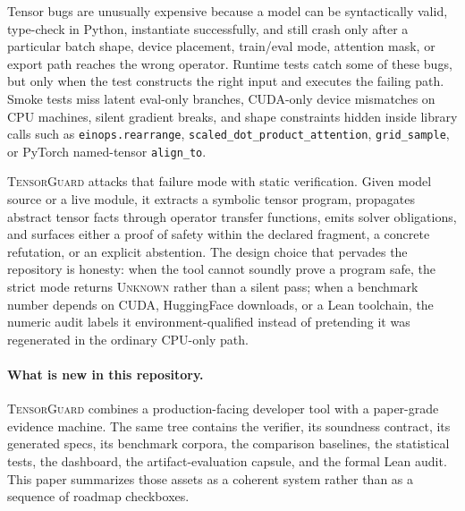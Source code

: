 \documentclass[11pt]{article}
\newcommand{\tg}{\textsc{TensorGuard}}
\newcommand{\unknown}{\textsc{Unknown}}
\begin{document}
Tensor bugs are unusually expensive because a model can be syntactically valid,
type-check in Python, instantiate successfully, and still crash only after a
particular batch shape, device placement, train/eval mode, attention mask, or
export path reaches the wrong operator.  Runtime tests catch some of these
bugs, but only when the test constructs the right input and executes the failing
path.  Smoke tests miss latent eval-only branches, CUDA-only device mismatches
on CPU machines, silent gradient breaks, and shape constraints hidden inside
library calls such as \texttt{einops.rearrange},
\texttt{scaled\_dot\_product\_attention}, \texttt{grid\_sample}, or PyTorch
named-tensor \texttt{align\_to}.

\tg{} attacks that failure mode with static verification.  Given model source
or a live module, it extracts a symbolic tensor program, propagates abstract
tensor facts through operator transfer functions, emits solver obligations, and
surfaces either a proof of safety within the declared fragment, a concrete
refutation, or an explicit abstention.  The design choice that pervades the
repository is honesty: when the tool cannot soundly prove a program safe, the
strict mode returns \unknown{} rather than a silent pass; when a benchmark number
depends on CUDA, HuggingFace downloads, or a Lean toolchain, the numeric audit
labels it environment-qualified instead of pretending it was regenerated in the
ordinary CPU-only path.

\paragraph{What is new in this repository.}
\tg{} combines a production-facing developer tool with a paper-grade evidence
machine.  The same tree contains the verifier, its soundness contract, its
generated specs, its benchmark corpora, the comparison baselines, the
statistical tests, the dashboard, the artifact-evaluation capsule, and the
formal Lean audit.  This paper summarizes those assets as a coherent system
rather than as a sequence of roadmap checkboxes.
\end{document}
